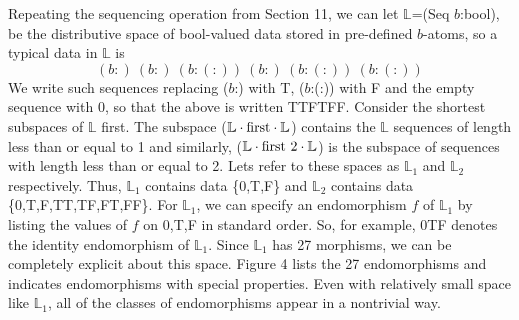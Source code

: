 \documentclass[11pt]{article}
\begin{document}
Repeating the sequencing operation from Section 11, we can let $\mathbb L$=(Seq $b$:bool), 
be the distributive space of bool-valued data stored in pre-defined $b$-atoms, so a typical data in $\mathbb L$ is 
\begin{equation}
(b:)\ (b:)\ (b:(:))\ (b:)\ (b:(:))\ (b:(:))
\end{equation}
We write such sequences replacing ($b$:) with T, ($b$:(:)) with F and the empty sequence with 0, so that the above is written TTFTFF.   
Consider the shortest subspaces of $\mathbb L$ first.  
The subspace (${\mathbb L}\cdot {\rm first}\cdot{\mathbb L}$) contains the $\mathbb L$ sequences of length less than or equal to 1 and similarly,  
(${\mathbb L}\cdot {\rm first\ 2}\cdot{\mathbb L}$) is the subspace of sequences with length less than or equal to 2.  Lets refer to these spaces as 
${\mathbb L}_1$ and ${\mathbb L}_2$ respectively.  
Thus, ${\mathbb L}_1$ contains data \{0,T,F\} and ${\mathbb L}_2$ contains data \{0,T,F,TT,TF,FT,FF\}. 
For ${\mathbb L}_1$, we can specify an endomorphism $f$ of ${\mathbb L}_1$ by listing the values of $f$ on 0,T,F in standard order.  So, for example, 
0TF denotes the identity endomorphism of ${\mathbb L}_1$.  
Since ${\mathbb L}_1$ has 27 morphisms, we can be completely explicit about this space.  
Figure 4 lists the 27 endomorphisms and indicates endomorphisms with special properties.  Even with relatively small space like ${\mathbb L}_1$, all of 
the classes of endomorphisms appear in a nontrivial way.
\end{document}
